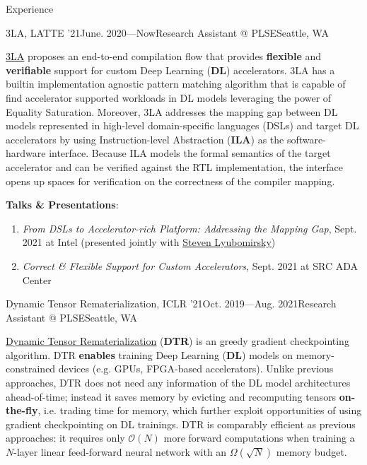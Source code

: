 \documentclass{resume}
\newcommand{\myul}[2][blue]{\setulcolor{#1}\ul{#2}\setulcolor{blue}}
\begin{document}
    \begin{rSection}{Experience}
        \begin{rSubsection}{3LA, LATTE '21}{June. 2020---Now}{Research Assistant @ PLSE}{Seattle, WA}
            \item \href{https://capra.cs.cornell.edu/latte21/paper/30.pdf}{\color{blue} \myul{3LA}} proposes an end-to-end compilation flow that provides \textbf{flexible} and \textbf{verifiable} support for custom Deep Learning (\textbf{DL}) accelerators. 3LA has a builtin implementation agnostic pattern matching algorithm that is capable of find accelerator supported workloads in DL models leveraging the power of Equality Saturation. Moreover, 3LA addresses the mapping gap between DL models represented in high-level domain-specific languages (DSLs) and target DL accelerators by using Instruction-level Abstraction (\textbf{ILA}) as the software-hardware interface. Because ILA models the formal semantics of the target accelerator and can be verified against the RTL implementation, the interface opens up spaces for verification on the correctness of the compiler mapping.
            \item \textbf{Talks \& Presentations}:
            \vspace{-5pt}
                \begin{enumerate}
                    \setlength{\itemsep}{1pt}
                    \setlength{\parskip}{0pt}
                    \setlength{\parsep}{0pt}
                    \item \textit{From DSLs to Accelerator-rich Platform: Addressing the Mapping Gap}, Sept. 2021 at Intel (presented jointly with \href{https://homes.cs.washington.edu/~sslyu/}{\color{blue} \myul {Steven Lyubomirsky}})
                    \item \textit{Correct \& Flexible Support for Custom Accelerators}, Sept. 2021 at SRC ADA Center
                \end{enumerate} 
        \end{rSubsection}
        \vspace{-5pt}
        \begin{rSubsection}{Dynamic Tensor Rematerialization, ICLR '21}{Oct. 2019---Aug. 2021}{Research Assistant @ PLSE}{Seattle, WA}
            \item \href{https://github.com/uwsampl/dtr-prototype}{\color{blue} \myul{Dynamic Tensor Rematerialization}} (\textbf{DTR}) is an greedy gradient checkpointing algorithm. DTR \textbf{enables} training Deep Learning (\textbf{DL}) models on memory-constrained devices (e.g. GPUs, FPGA-based accelerators). Unlike previous approaches, DTR does not need any information of the DL model architectures ahead-of-time; instead it saves memory by evicting and recomputing tensors \textbf{on-the-fly}, i.e. trading time for memory, which further exploit opportunities of using gradient checkpointing on DL trainings. DTR is comparably efficient as previous approaches: it requires only $\mathcal{O}(N)$ more forward computations when training a $N$-layer linear feed-forward neural network with an $\Omega(\sqrt{N})$ memory budget.

\end{rSubsection}
\end{rSection}
\end{document}
